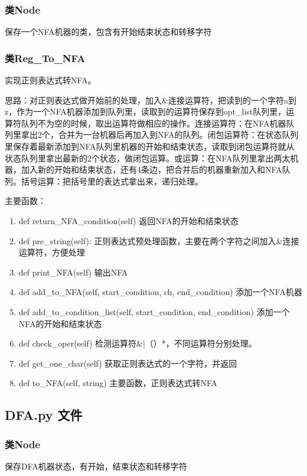 \documentclass[]{article}
\begin{document}
\subsubsection*{类Node}
保存一个NFA机器的类，包含有开始结束状态和转移字符

\subsubsection*{类Reg\_To\_NFA}
实现正则表达式转NFA。

思路：对正则表达式做开始前的处理，加入\&连接运算符，把读到的一个字符a到z，作为一个NFA机器添加到队列里，读取到的运算符保存到opt\_list队列里，运算符队列不为空的时候，取出运算符做相应的操作。连接运算符：在NFA机器队列里拿出2个，合并为一台机器后再加入到NFA的队列。闭包运算符：在状态队列里保存着最新添加到NFA队列里机器的开始和结束状态，读取到闭包运算符就从状态队列里拿出最新的2个状态，做闭包运算。或运算：在NFA队列里拿出两太机器，加入新的开始和结束状态，还有4条边，把合并后的机器重新加入和NFA队列。括号运算：把括号里的表达式拿出来，递归处理。

主要函数：
\begin{enumerate}
	\item def return\_NFA\_condition(self)  返回NFA的开始和结束状态
	\item def pre\_string(self):  正则表达式预处理函数，主要在两个字符之间加入\&连接运算符，方便处理
	\item def print\_NFA(self)  输出NFA
	\item def add\_to\_NFA(self, start\_condition, ch, end\_condition)  添加一个NFA机器
	\item def add\_to\_condition\_list(self, start\_condition, end\_condition)  添加一个NFA的开始和结束状态
	\item   def check\_oper(self)  检测运算符\&|（）*，不同运算符分别处理。
	\item   def get\_one\_char(self)  获取正则表达式的一个字符，并返回
	\item   def to\_NFA(self, string)  主要函数，正则表达式转NFA
\end{enumerate}
\subsection{DFA.py 文件}

\subsubsection*{类Node}
保存DFA机器状态，有开始，结束状态和转移字符
\end{document}
